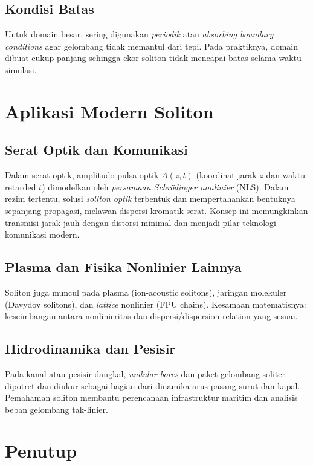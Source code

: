 \documentclass{bukumjh}
\begin{document}
\subsection*{Kondisi Batas}
Untuk domain besar, sering digunakan \emph{periodik} atau \emph{absorbing boundary conditions} agar gelombang tidak memantul dari tepi. 
Pada praktiknya, domain dibuat cukup panjang sehingga ekor soliton tidak mencapai batas selama waktu simulasi.

\section{Aplikasi Modern Soliton}

\subsection*{Serat Optik dan Komunikasi}
Dalam serat optik, amplitudo pulsa optik $A(z,t)$ (koordinat jarak $z$ dan waktu retarded $t$) dimodelkan oleh \emph{persamaan Schr\"odinger nonlinier} (NLS). 
Dalam rezim tertentu, solusi \emph{soliton optik} terbentuk dan mempertahankan bentuknya sepanjang propagasi, melawan dispersi kromatik serat. 
Konsep ini memungkinkan transmisi jarak jauh dengan distorsi minimal dan menjadi pilar teknologi komunikasi modern.

\subsection*{Plasma dan Fisika Nonlinier Lainnya}
Soliton juga muncul pada plasma (ion-acoustic solitons), jaringan molekuler (Davydov solitons), dan \emph{lattice} nonlinier (FPU chains). 
Kesamaan matematisnya: keseimbangan antara nonlinieritas dan dispersi/dispersion relation yang sesuai.

\subsection*{Hidrodinamika dan Pesisir}
Pada kanal atau pesisir dangkal, \emph{undular bores} dan paket gelombang soliter dipotret dan diukur sebagai bagian dari dinamika arus pasang-surut dan kapal. 
Pemahaman soliton membantu perencanaan infrastruktur maritim dan analisis beban gelombang tak-linier.

\section{Penutup}
\end{document}
